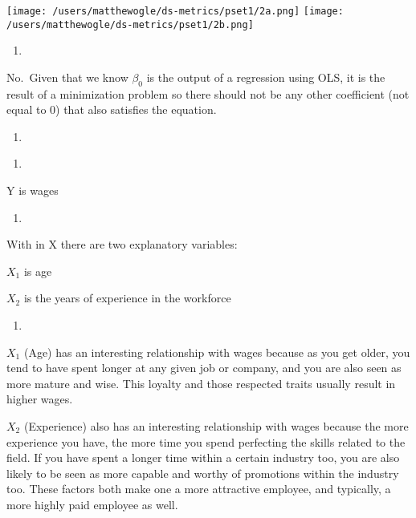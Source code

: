 \documentclass[
  12pt,
  landscape]{article}
\author{}
\date{\vspace{-2.5em}}
\begin{document}
\texttt{[image: /users/matthewogle/ds-metrics/pset1/2a.png]}
\texttt{[image: /users/matthewogle/ds-metrics/pset1/2b.png]}

\begin{enumerate}
\def\labelenumi{(\alph{enumi})}
\setcounter{enumi}{2}
\item
\end{enumerate}

No.~Given that we know \(\beta_0\) is the output of a regression using
OLS, it is the result of a minimization problem so there should not be
any other coefficient (not equal to 0) that also satisfies the equation.

\begin{enumerate}
\def\labelenumi{(\alph{enumi})}
\setcounter{enumi}{3}
\item
\end{enumerate}

\begin{enumerate}
\def\labelenumi{\roman{enumi})}
\item
\end{enumerate}

Y is wages

\begin{enumerate}
\def\labelenumi{\roman{enumi})}
\setcounter{enumi}{1}
\item
\end{enumerate}

With in X there are two explanatory variables:

\(X_1\) is age

\(X_2\) is the years of experience in the workforce

\begin{enumerate}
\def\labelenumi{\roman{enumi})}
\setcounter{enumi}{2}
\item
\end{enumerate}

\(X_1\) (Age) has an interesting relationship with wages because as you
get older, you tend to have spent longer at any given job or company,
and you are also seen as more mature and wise. This loyalty and those
respected traits usually result in higher wages.

\(X_2\) (Experience) also has an interesting relationship with wages
because the more experience you have, the more time you spend perfecting
the skills related to the field. If you have spent a longer time within
a certain industry too, you are also likely to be seen as more capable
and worthy of promotions within the industry too. These factors both
make one a more attractive employee, and typically, a more highly paid
employee as well.
\end{document}
